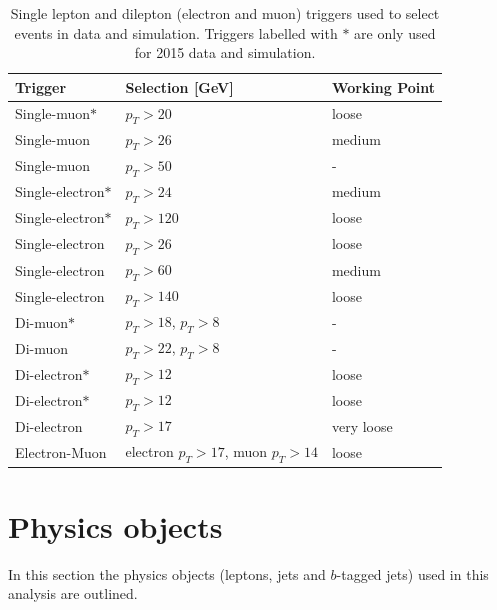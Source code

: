 \begin{table}[!htb]
\footnotesize
\def\arraystretch{1.3}
\begin{center}
\begin{tabular}{ l|l|l }
\hline
\hline
Trigger & Selection [GeV] & Working Point  \\ \hline
Single-muon$*$ & $p_{T} > 20$ & loose\\
Single-muon &  $p_{T} > 26$ & medium \\
Single-muon  &  $p_{T} > 50$ & - \\
Single-electron$*$  & $p_{T} > 24$ & medium \\
Single-electron$*$  & $p_{T} > 120$ & loose \\
Single-electron  & $p_{T} > 26$ & loose \\
Single-electron  & $p_{T} > 60$ & medium \\
Single-electron  & $p_{T} > 140$ & loose \\
Di-muon$*$  & $p_{T} > 18$, $p_{T} > 8$  & - \\
Di-muon  & $p_{T} > 22$, $p_{T} > 8$  & - \\
Di-electron$*$ & $p_{T} > 12$  & loose \\
Di-electron$*$ & $p_{T} > 12$  & loose \\
Di-electron & $p_{T} > 17$  & very loose \\
Electron-Muon & electron $p_{T}> 17$, muon $p_{T} > 14$ & loose\\

\hline
\hline
\end{tabular}
\caption{Single lepton and dilepton (electron and muon) triggers used to select events in data and simulation. Triggers labelled with $*$ are only used for 2015 data and simulation.}
\label{tab:triggers}
\end{center}
\end{table}
\section{Physics objects}
In this section the physics objects (leptons, jets and $b$-tagged jets) used in this analysis are outlined.

